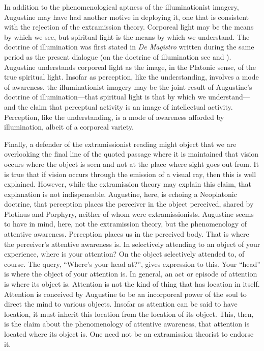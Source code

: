 \documentclass[12pt]{article}
\begin{document}
In addition to the phenomenological aptness of the illuminationist imagery, Augustine may have had another motive in deploying it, one that is consistent with the rejection of the extramission theory. Corporeal light may be the means by which we see, but spiritual light is the means by which we understand. The doctrine of illumination was first stated in \emph{De Magistro} written during the same period as the present dialogue (on the doctrine of illumination see \citealt{Allers:1952os} and \citealt{Matthews:2014aa}). Augustine understands corporeal light as the image, in the Platonic sense, of the true spiritual light.  Insofar as perception, like the understanding, involves a mode of awareness, the illuminationist imagery may be the joint result of Augustine's doctrine of illumination---that spiritual light is that by which we understand---and the claim that perceptual activity is an image of intellectual activity. Perception, like the understanding, is a mode of awareness afforded by illumination, albeit of a corporeal variety. 

Finally, a defender of the extramissionist reading might object that we are overlooking the final line of the quoted passage where it is maintained that vision occurs where the object is seen and not at the place where sight goes out from. It is true that if vision occurs through the emission of a visual ray, then this is well explained. However, while the extramission theory may explain this claim, that explanation is not indispensable. Augustine, here, is echoing a Neoplatonic doctrine, that perception places the perceiver in the object perceived, shared by Plotinus and Porphyry, neither of whom were extramissionists. Augustine seems to have in mind, here, not the extramission theory, but the phenomenology of attentive awareness. Perception places us in the perceived body. That is where the perceiver’s attentive awareness is. In selectively attending to an object of your experience, where is your attention? On the object selectively attended to, of course. The query, ``Where’s your head at?'', gives expression to this. Your ``head'' is where the object of your attention is. In general, an act or episode of attention is where its object is. Attention is not the kind of thing that has location in itself. Attention is conceived by Augustine to be an incorporeal power of the soul to direct the mind to various objects. Insofar as attention can be said to have location, it must inherit this location from the location of its object. This, then, is the claim about the phenomenology of attentive awareness, that attention is located where its object is. One need not be an extramission theorist to endorse it.
\end{document}
